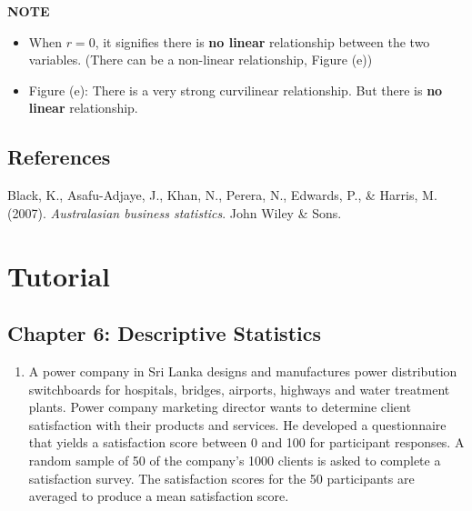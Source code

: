 \documentclass[]{book}
\providecommand{\tightlist}{%
  \setlength{\itemsep}{0pt}\setlength{\parskip}{0pt}}
\begin{document}
\textbf{NOTE}

\begin{itemize}
\tightlist
\item
  When \(r=0\), it signifies there is \textbf{no linear} relationship between the two variables. (There can be a non-linear relationship, Figure (e))
\item
  Figure (e): There is a very strong curvilinear relationship. But there is \textbf{no linear} relationship.
\end{itemize}

\hypertarget{references}{%
\subsection*{References}\label{references}}

Black, K., Asafu-Adjaye, J., Khan, N., Perera, N., Edwards, P., \& Harris, M. (2007). \emph{Australasian business statistics}. John Wiley \& Sons.

\newpage


\hypertarget{tutorial}{%
\section{Tutorial}\label{tutorial}}

\hypertarget{chapter-6-descriptive-statistics}{%
\subsection*{Chapter 6: Descriptive Statistics}\label{chapter-6-descriptive-statistics}}

\begin{enumerate}
\def\labelenumi{\arabic{enumi}.}
\tightlist
\item
  A power company in Sri Lanka designs and manufactures power distribution switchboards for hospitals, bridges, airports, highways and water treatment plants. Power company marketing director wants to determine client satisfaction with their products and services. He developed a questionnaire that yields a satisfaction score between 0 and 100 for participant responses. A random sample of 50 of the company's 1000 clients is asked to complete a satisfaction survey. The satisfaction scores for the 50 participants are averaged to produce a mean satisfaction score.
\end{enumerate}
\end{document}
